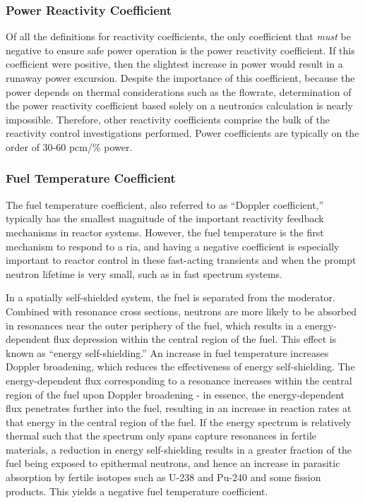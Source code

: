 \subsubsection{Power Reactivity Coefficient}
Of all the definitions for reactivity coefficients, the only coefficient that {\it must} be negative to ensure safe power operation is the power reactivity coefficient. If this coefficient were positive, then the slightest increase in power would result in a runaway power excursion. Despite the importance of this coefficient, because the power depends on thermal considerations such as the flowrate, determination of the power reactivity coefficient based solely on a neutronics calculation is nearly impossible. Therefore, other reactivity coefficients comprise the bulk of the reactivity control investigations performed. Power coefficients are typically on the order of 30-60 pcm/\% power.

\subsubsection{Fuel Temperature Coefficient}
The fuel temperature coefficient, also referred to as ``Doppler coefficient,'' typically has the smallest magnitude of the important reactivity feedback mechanisms in reactor systems. However, the fuel temperature is the first mechanism to respond to a \gls{ria}, and having a negative coefficient is especially important to reactor control in these fast-acting transients and when the prompt neutron lifetime is very small, such as in fast spectrum systems.

In a spatially self-shielded system, the fuel is separated from the moderator. Combined with resonance cross sections, neutrons are more likely to be absorbed in resonances near the outer periphery of the fuel, which results in a energy-dependent flux depression within the central region of the fuel. This effect is known as ``energy self-shielding.'' An increase in fuel temperature increases Doppler broadening, which reduces the effectiveness of energy self-shielding. The energy-dependent flux corresponding to a resonance increases within the central region of the fuel upon Doppler broadening - in essence, the energy-dependent flux penetrates further into the fuel, resulting in an increase in reaction rates at that energy in the central region of the fuel. If the energy spectrum is relatively thermal such that the spectrum only spans capture resonances in fertile materials, a reduction in energy self-shielding results in a greater fraction of the fuel being exposed to epithermal neutrons, and hence an increase in parasitic absorption by fertile isotopes such as U-238 and Pu-240 and some fission products. This yields a negative fuel temperature coefficient. %

